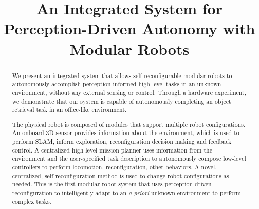 \documentclass[conference]{IEEEtran}
\begin{document}
\title{An Integrated System for Perception-Driven Autonomy with Modular Robots}



\maketitle

\begin{abstract}

We present an integrated system that allows self-reconfigurable modular robots to autonomously accomplish perception-informed high-level tasks in an unknown environment, without any external sensing or control.  Through a hardware experiment, we demonstrate that our system is capable of autonomously completing an object retrieval task in an office-like environment.

The physical robot is composed of modules that support multiple robot configurations. An onboard 3D sensor provides information about the environment, which is used to perform SLAM, inform exploration, reconfiguration decision making and feedback control.  A centralized high-level mission planner uses information from the environment and the user-specified task description to autonomously compose low-level controllers to perform locomotion, reconfiguration, other behaviors. A novel, centralized, self-reconfiguration method is used to change robot configurations as needed. This is the first modular robot system that uses perception-driven reconfiguration to intelligently adapt to an \textit{a priori} unknown environment to perform complex tasks.

\end{abstract}

\IEEEpeerreviewmaketitle

\end{document}

